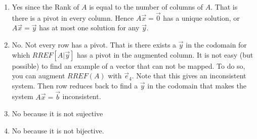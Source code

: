 \begin{SaveQuestion}[
        key=ch2-injsur-3to4-sbg,
        prompt={Consider the Linear transformation $T:\bbR^3\to \bbR^4$ given by $T(\vec x) = A \vec x$ where \\ $A= \begin{bmatrix} 1 & 1 & 1 \\ -1 & 0 & 1 \\ 2 & -1 & 0 \\ 2 & 0 & 2 \\ \end{bmatrix}$ with REF$(A) = \begin{bmatrix} 1 & 1 & 1\\ 0 & 1 & 2\\ 0 & 0 & 1\\ 0 & 0 & 0\\ \end{bmatrix}$. \begin{enumerate} \item Is $T$ injective, why? If not, give an example of two different input vectors that are mapped to the same output. \item Is $T$ surjective, why? If not, can you give an example of a vector in the codomain which can not be reached by $T$. \item Is $T$ bijective, why? \item Is $T$ invertible, why? \end{enumerate}}
][ch2-CON-surinj] %
    \begin{enumerate}
            \item Yes since the Rank of $A$ is equal to the number of columns of $A$. That is there is a pivot in every column. Hence $A\vec x=\vec 0$ has a unique solution, or $A\vec x=\vec y$ has at most one solution for any $\vec y$. 
            \item No. Not every row has a pivot. That is there exists a $\vec y$ in the codomain for which $RREF[A|\vec y]$ has a pivot in the augmented column. It is not easy (but possible) to find an example of a vector that can not be mapped. To do so, you can augment $RREF(A)$ with $\vec e_4$. Note that this gives an inconsistent system. Then row reduces back to find a  $\vec y$ in the codomain that makes the system $A\vec x=\vec b$ inconsistent. 
            \item No because it is not sujective
            \item No because it is not bijective. 
        \end{enumerate}
\end{SaveQuestion}

